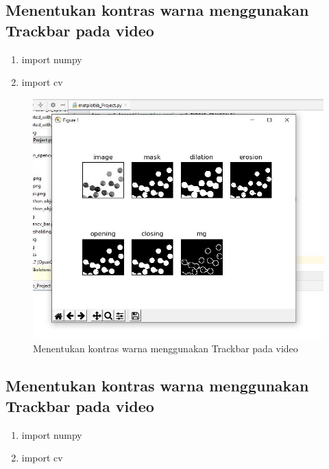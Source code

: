 \newpage
\subsection{Menentukan kontras warna menggunakan Trackbar pada video}

\begin{enumerate}
	\item import numpy
	\item import cv
\end{enumerate}

\newpage
\begin{figure}[ht]
\centering
\includegraphics[scale=0.5]{figures/2,57.jpg}
\caption{Menentukan kontras warna menggunakan Trackbar pada video}
\label{contoh}
\end{figure}






\newpage
\subsection{Menentukan kontras warna menggunakan Trackbar pada video}

\begin{enumerate}
	\item import numpy
	\item import cv
\end{enumerate}

